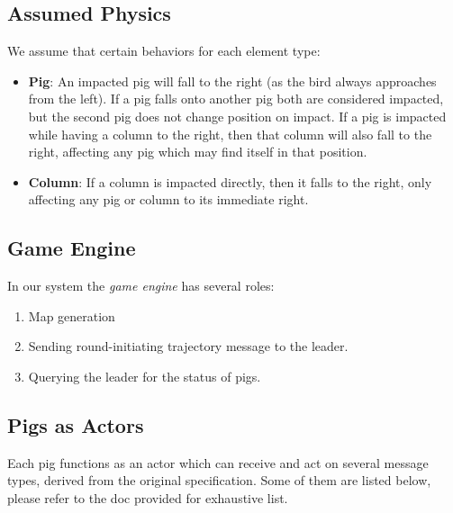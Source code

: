 \documentclass[]{article}
\begin{document}
\subsection{Assumed Physics}

We assume that certain behaviors for each element type:

\begin{itemize}
\item
  \textbf{Pig}: An impacted pig will fall to the right (as the bird
  always approaches from the left). If a pig falls onto another pig both
  are considered impacted, but the second pig does not change position
  on impact. If a pig is impacted while having a column to the right,
  then that column will also fall to the right, affecting any pig which
  may find itself in that position.
\item
  \textbf{Column}: If a column is impacted directly, then it falls to
  the right, only affecting any pig or column to its immediate right.
\end{itemize}

\subsection{Game Engine}

In our system the \emph{game engine} has several roles:

\begin{enumerate}[1.]
\item
  Map generation
\item
  Sending round-initiating trajectory message to the leader.
\item
  Querying the leader for the status of pigs. 
\end{enumerate}

\subsection{Pigs as Actors}

Each pig functions as an actor which can receive and act on several
message types, derived from the original specification. Some of them are listed below,
please refer to the doc provided for exhaustive list.
\end{document}
